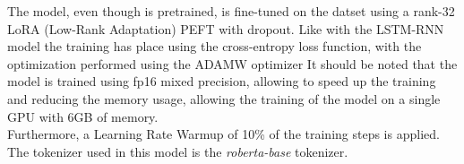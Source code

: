             The model, even though is pretrained, is fine-tuned on the datset using a rank-32 LoRA (Low-Rank Adaptation) PEFT
            with dropout. Like with the LSTM-RNN model the training has place using the cross-entropy loss function, 
            with the optimization performed using the ADAMW optimizer \citep{loshchilov2019decoupledweightdecayregularization}
            It should be noted that the model is trained using fp16 mixed precision, allowing
            to speed up the training and reducing the memory usage, allowing the
            training of the model on a single GPU with 6GB of memory.\\

            Furthermore, a Learning Rate Warmup \citep{kalra2024warmuplearningrateunderlying} of 10\% of the training steps
            is applied.
            The tokenizer used in this model is the \textit{roberta-base} tokenizer.